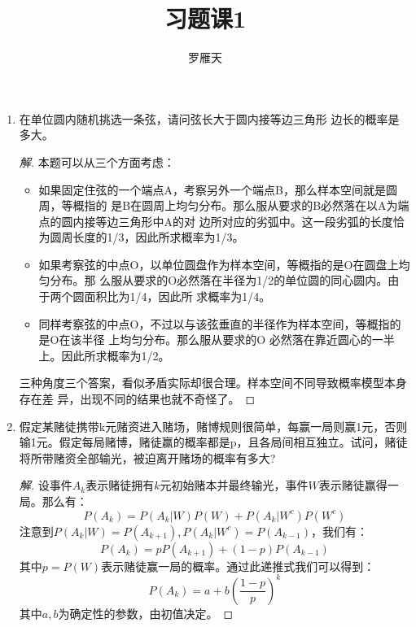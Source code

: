 \documentclass[11pt]{article}
\begin{document}
\author{罗雁天}
\title{习题课1}
\maketitle

\medskip

\begin{enumerate}

\item 在单位圆内随机挑选一条弦，请问弦长大于圆内接等边三角形 边长的概率是多大。
\begin{proof}[解]
	本题可以从三个方面考虑：
	\begin{itemize}
		\item 如果固定住弦的一个端点A，考察另外一个端点B，那么样本空间就是圆周，等概指的 是B在圆周上均匀分布。那么服从要求的B必然落在以A为端点的圆内接等边三角形中A的对 边所对应的劣弧中。这一段劣弧的长度恰为圆周长度的1/3，因此所求概率为1/3。
		\item 如果考察弦的中点O，以单位圆盘作为样本空间，等概指的是O在圆盘上均匀分布。那 么服从要求的O必然落在半径为1/2的单位圆的同心圆内。由于两个圆面积比为1/4，因此所 求概率为1/4。
		\item 同样考察弦的中点O，不过以与该弦垂直的半径作为样本空间，等概指的是O在该半径 上均匀分布。那么服从要求的O 必然落在靠近圆心的一半上。因此所求概率为1/2。
	\end{itemize}
	三种角度三个答案，看似矛盾实际却很合理。样本空间不同导致概率模型本身存在差 异，出现不同的结果也就不奇怪了。
\end{proof}

\item 假定某赌徒携带k元赌资进入赌场，赌博规则很简单，每赢一局则赢1元，否则输1元。假定每局赌博，赌徒赢的概率都是p，且各局间相互独立。试问，赌徒将所带赌资全部输光，被迫离开赌场的概率有多大?
\begin{proof}[解]
	设事件$A_k$表示赌徒拥有$k$元初始赌本并最终输光，事件$W$表示赌徒赢得一局。那么有：
	\begin{equation}
	P(A_k)=P(A_k|W)P(W)+P(A_k|W^c)P(W^c)
	\end{equation}
	注意到$P(A_k|W)=P(A_{k+1}),P(A_k|W^c)=P(A_{k-1})$，我们有：
	\begin{equation}
	P(A_k)=pP(A_{k+1})+(1-p)P(A_{k-1})
	\end{equation}
	其中$p=P(W)$表示赌徒赢一局的概率。通过此递推式我们可以得到：
	\begin{equation}
	P(A_k)=a+b\left(\frac{1-p}{p}\right)^k
	\end{equation}
	其中$a,b$为确定性的参数，由初值决定。
	

\end{proof}
\end{enumerate}
\end{document}
